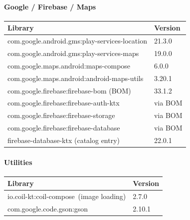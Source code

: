 \documentclass{article}
\begin{document}
                        \paragraph{Google / Firebase / Maps}

                        \begin{center}
                            \begin{tabular}{p{7cm} p{4cm}}
                            \toprule
                            \textbf{Library} & \textbf{Version} \\ \midrule
                                com.google.android.gms:play-services-location & 21.3.0 \\ \addlinespace
                                com.google.android.gms:play-services-maps & 19.0.0 \\ \addlinespace
                                com.google.maps.android:maps-compose & 6.0.0 \\ \addlinespace
                                com.google.maps.android:android-maps-utils & 3.20.1 \\ \addlinespace
                                com.google.firebase:firebase-bom (BOM) & 33.1.2 \\ \addlinespace
                                com.google.firebase:firebase-auth-ktx & via BOM \\ \addlinespace
                                com.google.firebase:firebase-storage & via BOM \\ \addlinespace
                                com.google.firebase:firebase-database & via BOM \\ \addlinespace
                                firebase-database-ktx (catalog entry) & 22.0.1 \\ \bottomrule
                            \end{tabular}
                        \end{center}

                        \paragraph{Utilities}

                        \begin{center}
                            \begin{tabular}{p{7cm} p{4cm}}
                            \toprule
                            \textbf{Library} & \textbf{Version} \\ \midrule
                                io.coil-kt:coil-compose\ (image loading) & 2.7.0 \\ \addlinespace
                                com.google.code.gson:gson & 2.10.1 \\ \bottomrule
                            \end{tabular}
                        \end{center}
\end{document}
